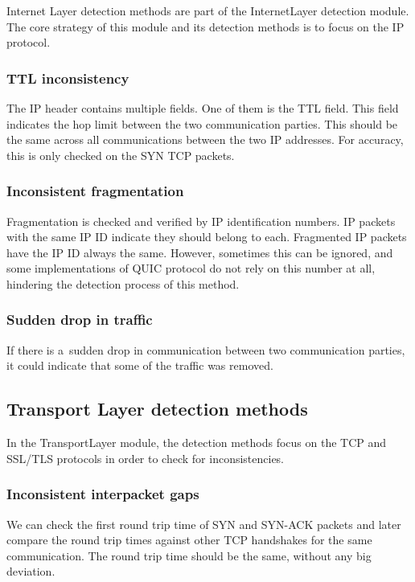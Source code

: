 \documentclass[
  printed,     %
  color,       %
  oneside,     %
  nosansbold,  %
  nocolorbold, %
  nolof,         %
  nolot,         %
]{fithesis4}
\begin{document}
Internet Layer detection methods are part of the InternetLayer detection module. The core strategy of this module and its detection methods is to focus on the IP protocol.

\subsubsection{TTL inconsistency}

The IP header contains multiple fields. One of them is the TTL field. This field indicates the hop limit between the two communication parties. This should be the same across all communications between the two IP addresses. For accuracy, this is only checked on the SYN TCP packets.

\subsubsection{Inconsistent fragmentation}

Fragmentation is checked and verified by IP identification numbers. IP packets with the same IP ID indicate they should belong to each. Fragmented IP packets have the IP ID always the same. However, sometimes this can be ignored, and some implementations of QUIC protocol do not rely on this number at all, hindering the detection process of this method.

\subsubsection{Sudden drop in traffic}

If there is a~sudden drop in communication between two communication parties, it could indicate that some of the traffic was removed.

\subsection{Transport Layer detection methods}

In the TransportLayer module, the detection methods focus on the TCP and SSL/TLS protocols in order to check for inconsistencies.

\subsubsection{Inconsistent interpacket gaps}

We can check the first round trip time of SYN and SYN-ACK packets and later compare the round trip times against other TCP handshakes for the same communication. The round trip time should be the same, without any big deviation.
\end{document}
